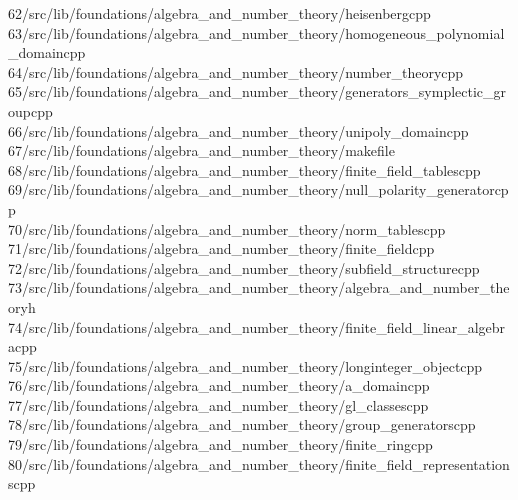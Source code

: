 \begin{tabbing}
62\>/src/lib/foundations/algebra\_and\_number\_theory/heisenbergcpp\\[0pt]
63\>/src/lib/foundations/algebra\_and\_number\_theory/homogeneous\_polynomial\_domaincpp\\[0pt]
64\>/src/lib/foundations/algebra\_and\_number\_theory/number\_theorycpp\\[0pt]
65\>/src/lib/foundations/algebra\_and\_number\_theory/generators\_symplectic\_groupcpp\\[0pt]
66\>/src/lib/foundations/algebra\_and\_number\_theory/unipoly\_domaincpp\\[0pt]
67\>/src/lib/foundations/algebra\_and\_number\_theory/makefile\\[0pt]
68\>/src/lib/foundations/algebra\_and\_number\_theory/finite\_field\_tablescpp\\[0pt]
69\>/src/lib/foundations/algebra\_and\_number\_theory/null\_polarity\_generatorcpp\\[0pt]
70\>/src/lib/foundations/algebra\_and\_number\_theory/norm\_tablescpp\\[0pt]
71\>/src/lib/foundations/algebra\_and\_number\_theory/finite\_fieldcpp\\[0pt]
72\>/src/lib/foundations/algebra\_and\_number\_theory/subfield\_structurecpp\\[0pt]
73\>/src/lib/foundations/algebra\_and\_number\_theory/algebra\_and\_number\_theoryh\\[0pt]
74\>/src/lib/foundations/algebra\_and\_number\_theory/finite\_field\_linear\_algebracpp\\[0pt]
75\>/src/lib/foundations/algebra\_and\_number\_theory/longinteger\_objectcpp\\[0pt]
76\>/src/lib/foundations/algebra\_and\_number\_theory/a\_domaincpp\\[0pt]
77\>/src/lib/foundations/algebra\_and\_number\_theory/gl\_classescpp\\[0pt]
78\>/src/lib/foundations/algebra\_and\_number\_theory/group\_generatorscpp\\[0pt]
79\>/src/lib/foundations/algebra\_and\_number\_theory/finite\_ringcpp\\[0pt]
80\>/src/lib/foundations/algebra\_and\_number\_theory/finite\_field\_representationscpp\\[0pt]

\end{tabbing}
